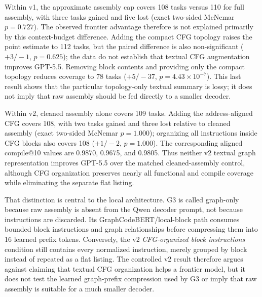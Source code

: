 \documentclass[11pt]{article}
\begin{document}
Within v1, the approximate assembly cap covers 108 tasks versus 110 for full assembly, with three tasks gained and five lost (exact two-sided McNemar \(p=0.727\)). The observed frontier advantage therefore is not explained primarily by this context-budget difference. Adding the compact CFG topology raises the point estimate to 112 tasks, but the paired difference is also non-significant (\(+3/-1\), \(p=0.625\)); the data do not establish that textual CFG augmentation improves GPT-5.5. Removing block contents and providing only the compact topology reduces coverage to 78 tasks (\(+5/-37\), \(p=4.43{\times}10^{-7}\)). This last result shows that the particular topology-only textual summary is lossy; it does not imply that raw assembly should be fed directly to a smaller decoder.

Within v2, cleaned assembly alone covers 109 tasks. Adding the address-aligned CFG covers 108, with two tasks gained and three lost relative to cleaned assembly (exact two-sided McNemar \(p=1.000\)); organizing all instructions inside CFG blocks also covers 108 (\(+1/-2\), \(p=1.000\)). The corresponding aligned compile@10 values are 0.9870, 0.9675, and 0.9805. Thus neither v2 textual graph representation improves GPT-5.5 over the matched cleaned-assembly control, although CFG organization preserves nearly all functional and compile coverage while eliminating the separate flat listing.

That distinction is central to the local architecture. G3 is called graph-only because raw assembly is absent from the Qwen decoder prompt, not because instructions are discarded. Its GraphCodeBERT/local-block path consumes bounded block instructions and graph relationships before compressing them into 16 learned prefix tokens. Conversely, the v2 \emph{CFG-organized block instructions} condition still contains every normalized instruction, merely grouped by block instead of repeated as a flat listing. The controlled v2 result therefore argues against claiming that textual CFG organization helps a frontier model, but it does not test the learned graph-prefix compression used by G3 or imply that raw assembly is suitable for a much smaller decoder.
\end{document}
